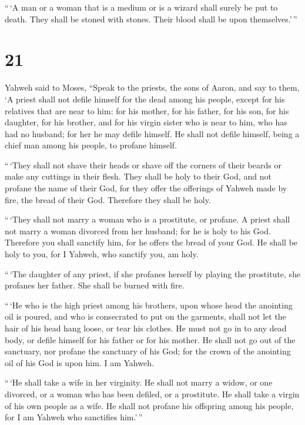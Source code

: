  ``\,`A man or a woman that is a medium or is a wizard
shall surely be put to death. They shall be stoned with stones. Their
blood shall be upon themselves.'\,''

\hypertarget{section-20}{%
\section{21}\label{section-20}}

 Yahweh said to Moses, ``Speak to the priests, the sons of
Aaron, and say to them, `A priest shall not defile himself for the dead
among his people,  except for his relatives that are near to
him: for his mother, for his father, for his son, for his daughter, for
his brother,  and for his virgin sister who is near to him,
who has had no husband; for her he may defile himself.  He
shall not defile himself, being a chief man among his people, to profane
himself.

 ``\,`They shall not shave their heads or shave off the
corners of their beards or make any cuttings in their flesh.
 They shall be holy to their God, and not profane the name
of their God, for they offer the offerings of Yahweh made by fire, the
bread of their God. Therefore they shall be holy.

 ``\,`They shall not marry a woman who is a prostitute, or
profane. A priest shall not marry a woman divorced from her husband; for
he is holy to his God.  Therefore you shall sanctify him,
for he offers the bread of your God. He shall be holy to you, for I
Yahweh, who sanctify you, am holy.

 ``\,`The daughter of any priest, if she profanes herself by
playing the prostitute, she profanes her father. She shall be burned
with fire.

 ``\,`He who is the high priest among his brothers, upon
whose head the anointing oil is poured, and who is consecrated to put on
the garments, shall not let the hair of his head hang loose, or tear his
clothes.  He must not go in to any dead body, or defile
himself for his father or for his mother.  He shall not go
out of the sanctuary, nor profane the sanctuary of his God; for the
crown of the anointing oil of his God is upon him. I am Yahweh.

 ``\,`He shall take a wife in her virginity. 
He shall not marry a widow, or one divorced, or a woman who has been
defiled, or a prostitute. He shall take a virgin of his own people as a
wife.  He shall not profane his offspring among his people,
for I am Yahweh who sanctifies him.'\,''

